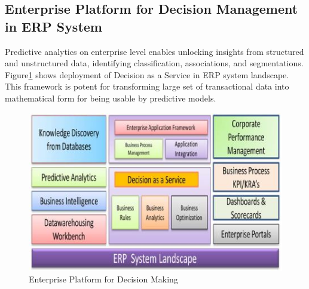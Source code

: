 \documentclass[runningheads]{llncs}
\begin{document}
\subsection{Enterprise Platform for Decision Management in ERP System}
Predictive analytics on enterprise level enables unlocking insights from structured and unstructured data, identifying classification, associations, and segmentations. Figure\ref{fig:Figure9} shows deployment of Decision as a Service in ERP system landscape. This framework is potent for transforming large set of transactional data into mathematical form for being usable by predictive models.
\begin{figure}[htbp]
	\centering
	
	\vspace{-1.3em}
	\hspace*{-0.45cm}
	
	\includegraphics[scale=0.65]{Figure11.jpg}
	\caption{Enterprise Platform for Decision Making \cite{2}}
	\label{fig:Figure9}
	
\end{figure}
\end{document}
